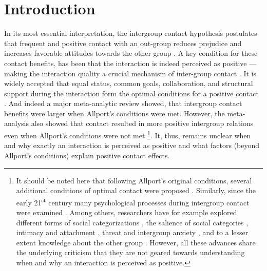 \section{Introduction}

In its most essential interpretation, the intergroup contact hypothesis postulates that frequent and positive contact with an out-group reduces prejudice and increases favorable attitudes towards the other group \citep[e.g.,][]{Hewstone1996, Pettigrew1998}. A key condition for these contact benefits, has been that the interaction is indeed perceived as positive --- making the interaction quality a crucial mechanism of inter-group contact \citep[e.g.,][]{MacInnis2015}. It is widely accepted that equal status, common goals, collaboration, and structural support during the interaction form the optimal conditions for a positive contact \citep[Allport's Optimal Contact conditions,][]{Allport1954b, Pettigrew1969}. And indeed a major meta-analytic review showed, that intergroup contact benefits were larger when Allport's conditions were met. However, the meta-analysis also showed that contact resulted in more positive intergroup relations even when Allport's conditions were not met \citep[][]{Pettigrew2006}\footnote{It should be noted here that following Allport's original conditions, several additional conditions of optimal contact were proposed \citep[for a critical discussion see][]{Pettigrew1986}. Similarly, since the early 21\textsuperscript{st} century many psychological processes during intergroup contact were examined \citep[e.g. see,][]{Paolini2021}. Among others, researchers have for example explored different forms of social categorizations \citep[][]{Pettigrew1998}, the salience of social categories \citep[][]{Brown2005}, intimacy \citep[e.g.,][]{Marinucci2021} and attachment \citep[e.g.,][]{Tropp2021}, threat and intergroup anxiety \citep[e.g.,][]{Stephan2008, Paolini2004}, and to a lesser extent knowledge about the other group \citep[][]{Pettigrew2008c}. However, all these advances share the underlying criticism that they are not geared towards understanding when and why an interaction is perceived as positive.}. It, thus, remains unclear when and why exactly an interaction is perceived as positive and what factors (beyond Allport's conditions) explain positive contact effects.

